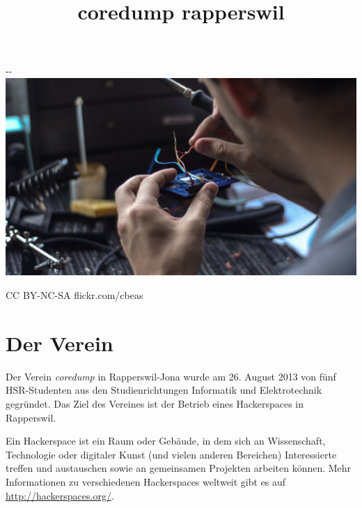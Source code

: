 \documentclass[10pt,a4paper,parskip,fleqn]{scrartcl}
\title{\Huge coredump rapperswil}
\begin{document}
\begin{titlepage}

	\maketitle

	\vspace{2cm}

	\begin{adjustwidth}{-\oddsidemargin-1in}{-\rightmargin-1in}
		\includegraphics[width=\paperwidth]{soldering.jpg}

		\vspace{-12mm}

		\hfill {\scriptsize \color{light-gray} CC BY-NC-SA flickr.com/cbeas}
	\end{adjustwidth}

	\vfill

\end{titlepage}

\section{Der Verein}

Der Verein \textit{coredump} in Rapperswil-Jona wurde am 26. August 2013 von
fünf HSR-Studenten aus den Studienrichtungen Informatik und Elektrotechnik
gegründet. Das Ziel des Vereines ist der Betrieb eines Hackerspaces in
Rapperswil.

Ein Hackerspace ist ein Raum oder Gebäude, in dem sich an Wissenschaft,
Technologie oder digitaler Kunst (und vielen anderen Bereichen) Interessierte
treffen und austauschen sowie an gemeinsamen Projekten arbeiten können. Mehr
Informationen zu verschiedenen Hackerspaces weltweit gibt es auf
\url{http://hackerspaces.org/}.
\end{document}
